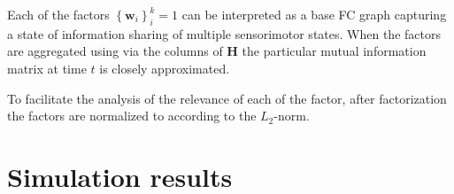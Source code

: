 Each of the factors $\left\lbrace\bm{w}_i\right\rbrace^k_i=1$ can be interpreted as a base FC graph capturing
a state of information sharing of multiple sensorimotor states. When the factors are aggregated using via the columns of $\bm{H}$ the particular mutual information matrix at time $t$ is closely approximated.

To facilitate the analysis of the relevance of each of the factor, after factorization the factors are normalized to according to the $L_2$-norm. 

%




\section{Simulation results}

